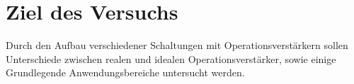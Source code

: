 \section{Ziel des Versuchs}
Durch den Aufbau verschiedener Schaltungen mit Operationsverstärkern sollen
Unterschiede zwischen realen und idealen Operationsverstärker, sowie einige
Grundlegende Anwendungsbereiche untersucht werden.

